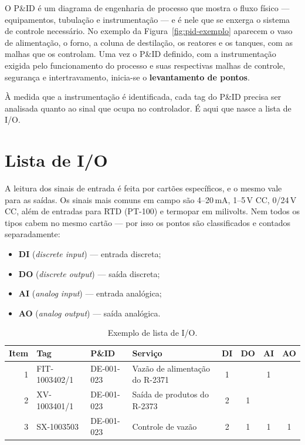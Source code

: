 O P\&ID é um diagrama de engenharia de processo que mostra o fluxo físico --- equipamentos,
tubulação e instrumentação --- e é nele que se enxerga o sistema de controle necessário. No exemplo
da Figura~\ref{fig:pid-exemplo} aparecem o vaso de alimentação, o forno, a coluna de destilação, os
reatores e os tanques, com as malhas que os controlam. Uma vez o P\&ID definido, com a instrumentação
exigida pelo funcionamento do processo e suas respectivas malhas de controle, segurança e
intertravamento, inicia-se o \textbf{levantamento de pontos}.

\`A medida que a instrumentação é identificada, cada tag do P\&ID precisa ser analisada quanto ao
sinal que ocupa no controlador. É aqui que nasce a lista de I/O.

\section{Lista de I/O}

A leitura dos sinais de entrada é feita por cartões específicos, e o mesmo vale para as saídas. Os
sinais mais comuns em campo são 4--20\,mA, 1--5\,V CC, 0/24\,V CC, além de entradas para RTD
(PT-100) e termopar em milivolts. Nem todos os tipos cabem no mesmo cartão --- por isso os pontos
são classificados e contados separadamente:

\begin{itemize}
  \item \textbf{DI} (\emph{discrete input}) --- entrada discreta;
  \item \textbf{DO} (\emph{discrete output}) --- saída discreta;
  \item \textbf{AI} (\emph{analog input}) --- entrada analógica;
  \item \textbf{AO} (\emph{analog output}) --- saída analógica.
\end{itemize}

\begin{table}[H]
  \centering
  \caption{Exemplo de lista de I/O.}
  \label{tab:lista-io}
  \begin{tabular}{r l l l c c c c}
    \toprule
    Item & Tag & P\&ID & Serviço & DI & DO & AI & AO \\
    \midrule
    1 & FIT-1003402/1 & DE-001-023 & Vazão de alimentação do R-2371 & 1 &   & 1 &   \\
    2 & XV-1003401/1  & DE-001-023 & Saída de produtos do R-2373      & 2 & 1 &   &   \\
    3 & SX-1003503    & DE-001-023 & Controle de vazão                & 2 & 1 & 1 & 1 \\
    \bottomrule
  \end{tabular}
\end{table}


